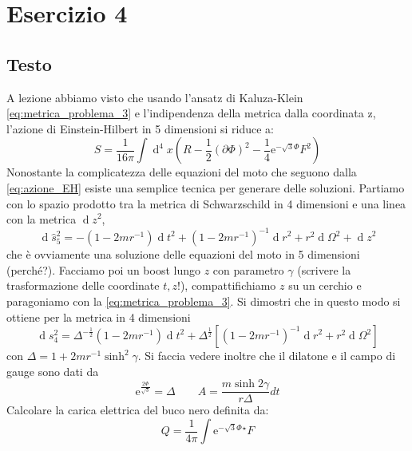 \documentclass[]{scrartcl}
\newcommand{\me}{\mathrm{e}}
\newcommand{\pd}{\partial}
\renewcommand{\d}[1]{\ensuremath{\operatorname{d}\!{#1}}}
\newcommand{\dddd}[1]{\ensuremath{\operatorname{d}^4\!{#1}}}
\newcommand{\hF}{{}^\star F}
\begin{document}
\section*{Esercizio 4}

\subsection*{Testo}
A lezione abbiamo visto che usando l'ansatz di Kaluza-Klein \eqref{eq:metrica_problema_3} e l'indipendenza della metrica dalla coordinata z,
l'azione di Einstein-Hilbert in 5 dimensioni si riduce a:
\begin{equation}
  \label{eq:azione_EH}
  S = \frac{1}{16 \pi} \int \dddd x \left( R - \frac{1}{2} (\pd \Phi)^2 - \frac{1}{4} \me^{-\sqrt{3}\Phi} F^2 \right)
\end{equation}
Nonostante la complicatezza delle equazioni del moto che seguono dalla \eqref{eq:azione_EH} esiste una semplice tecnica per generare
delle soluzioni. Partiamo con lo spazio prodotto tra la metrica di Schwarzschild in 4 dimensioni e una linea con la metrica $ \d z^2 $,
\begin{equation}
  \label{eq:metrica_per_linea}
  \d {\hat{s}}^2_5 = - \left( 1 - 2mr^{-1} \right) \d t^2 + \left( 1 - 2mr^{-1} \right)^{-1} \d r^2 + r^2 \d \Omega^2 + \d z^2
\end{equation}
che è ovviamente una soluzione delle equazioni del moto in 5 dimensioni (perché?). Facciamo poi un boost lungo $ z $ con parametro $ \gamma $
(scrivere la trasformazione delle coordinate $ t, z $!), compattifichiamo $ z $ su un cerchio e paragoniamo con la \eqref{eq:metrica_problema_3}.
Si dimostri che in questo modo si ottiene per la metrica in 4 dimensioni
\begin{equation}
  \label{eq:metrica_in_4_dimensioni}
  \d{s^2_4} = \Delta^{-\frac{1}{2}}\left( 1 - 2mr^{-1} \right)\d t^2 + \Delta^{\frac{1}{2}} \left[ \left( 1 - 2mr^{-1} \right)^{-1}\d r^2 + r^2 \d \Omega^2 \right]
\end{equation}
con $ \Delta = 1 + 2mr^{-1}\sinh^2 \gamma $. Si faccia vedere inoltre che il dilatone e il campo di gauge sono dati da
\begin{equation}
  \label{eq:dilatone_gauge}
  \me^{\frac{2\Phi}{\sqrt{3}}} = \Delta \qquad A = \frac{m \sinh 2 \gamma}{r \Delta} dt
\end{equation}
Calcolare la carica elettrica del buco nero definita da:
\begin{equation}
  \label{eq:carica_buco_nero}
  Q = \frac{1}{4\pi} \int \me^{-\sqrt{3}\Phi} \hF
\end{equation}
\end{document}
